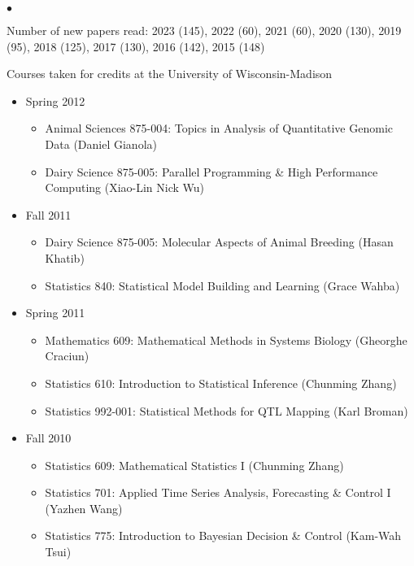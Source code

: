 \documentclass[margin,line,10pt]{res}
\newenvironment{list2}{
  \begin{list}{$\bullet$}{%
      \setlength{\itemsep}{0in}
      \setlength{\parsep}{0in} \setlength{\parskip}{0in}
      \setlength{\topsep}{0in} \setlength{\partopsep}{0in} 
      \setlength{\leftmargin}{0.2in}}}{\end{list}}
\begin{document}
\begin{resume}
\begin{list2}
  \vspace{0.3cm}
\item Number of new papers read: 2023 (145), 2022 (60), 2021 (60), 2020 (130), 2019 (95), 2018 (125), 2017 (130), 2016 (142), 2015 (148)


  \vspace{0.3cm}
\item Courses taken for credits at the University of Wisconsin-Madison 
  \begin{itemize}

\item Spring 2012
\begin{itemize}
\item    Animal Sciences 875-004: Topics in Analysis of Quantitative Genomic Data (Daniel Gianola)
\item    Dairy Science 875-005: Parallel Programming \& High Performance Computing (Xiao-Lin Nick Wu)
\end{itemize}


\item Fall 2011
\begin{itemize}
\item    Dairy Science 875-005: Molecular Aspects of Animal Breeding (Hasan Khatib)
\item    Statistics 840: Statistical Model Building and Learning (Grace Wahba)
\end{itemize}



\item Spring 2011
\begin{itemize}
\item    Mathematics 609: Mathematical Methods in Systems Biology (Gheorghe Craciun)
\item    Statistics 610: Introduction to Statistical Inference (Chunming Zhang)
\item    Statistics 992-001: Statistical Methods for QTL Mapping (Karl Broman)
\end{itemize}


\item Fall 2010
\begin{itemize}
\item    Statistics 609: Mathematical Statistics I (Chunming Zhang)
\item    Statistics 701: Applied Time Series Analysis, Forecasting \& Control I (Yazhen Wang)
\item    Statistics 775: Introduction to Bayesian Decision \& Control (Kam-Wah Tsui)
\end{itemize}



\end{itemize}
\end{list2}
\end{resume}
\end{document}

